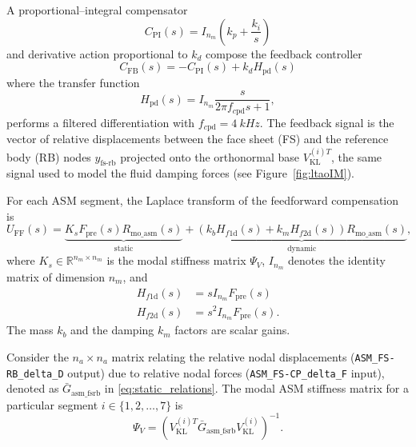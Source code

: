 \documentclass{gmto}
\begin{document}
A proportional--integral compensator 
\begin{equation*}
C_\text{PI}(s) = I_{n_m} \left(k_p + \frac{k_i}{s} \right)
\end{equation*}
and derivative action proportional to $k_d$ compose the feedback controller 
\[C_\text{FB}(s) = -C_\text{PI}(s) + k_d H_\text{pd}(s) \]
where the transfer function
\begin{equation*}
  H_\text{pd}(s) = I_{n_m} \frac{s}{2\pi f_{c\text{pd}}s + 1} , 
  \end{equation*}
performs a filtered differentiation with $f_{c\text{pd}} = \SI{4}{kHz}$. %
The feedback signal is the vector of relative displacements between the face sheet (FS) and the reference body (RB) nodes $y_\text{fs-rb}$ projected onto the orthonormal base $V_\text{KL}^{(i)T}$, the same signal used to model the fluid damping forces (see Figure~\ref{fig:ltaoIM}).

%
%
For each ASM segment, the Laplace transform of the feedforward compensation is 
\begin{equation}
\label{eq:U_FF_static_dyn}
U_\text{FF}(s) = \underbrace{K_s F_\text{pre}(s) R_\text{mo\_asm}(s)}_{\text{static}} + 
\underbrace{ \left(
k_b H_{f1\text{d}}(s) + k_m H_{f2\text{d}}(s) \right) R_\text{mo\_asm}(s)}_{\text{dynamic}},
\end{equation}
where $K_s \in \mathbb{R}^{n_m \times n_m}$ is the modal stiffness matrix $\Psi_V$, $I_{n_m}$ denotes the identity matrix of dimension $n_m$, and
\begin{align*}
  H_{f1\text{d}}(s) & =  s I_{n_m} F_\text{pre}(s) \\
  H_{f2\text{d}}(s) & = s^2 I_{n_m} F_\text{pre}(s)
  .
  \end{align*}
The mass $k_b$ and the damping $k_m$ factors are scalar gains.

Consider the $n_a \times n_a$ matrix relating the relative nodal displacements (\texttt{ASM\_FS-RB\_delta\_D} output) due to relative nodal forces (\texttt{ASM\_FS-CP\_delta\_F} input), denoted as $\bar{G}_\text{asm\_fsrb}$ in \eqref{eq:static_relations}. The modal ASM stiffness matrix for a particular segment $i \in \{1,2,\ldots,7\}$ is
\begin{equation}
\label{eq:Psi_V}
\Psi_V = \left( V_\text{KL}^{(i)T} \bar{G}_\text{asm\_fsrb} V_\text{KL}^{(i)} \right)^{-1}.
\end{equation}
\end{document}
